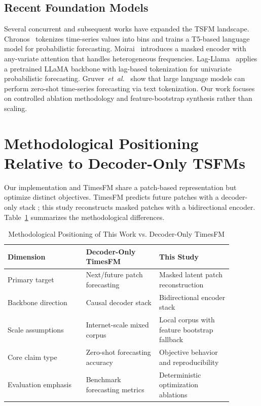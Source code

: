 \documentclass[journal]{IEEEtran}
\begin{document}
\subsection{Recent Foundation Models}
Several concurrent and subsequent works have expanded the TSFM landscape. Chronos~\cite{chronos2024} tokenizes time-series values into bins and trains a T5-based language model for probabilistic forecasting. Moirai~\cite{moirai2024} introduces a masked encoder with any-variate attention that handles heterogeneous frequencies. Lag-Llama~\cite{lagllama2024} applies a pretrained LLaMA backbone with lag-based tokenization for univariate probabilistic forecasting. Gruver~\emph{et~al.}~\cite{gruver2023llmtime} show that large language models can perform zero-shot time-series forecasting via text tokenization. Our work focuses on controlled ablation methodology and feature-bootstrap synthesis rather than scaling.

\section{Methodological Positioning Relative to Decoder-Only TSFMs}
Our implementation and TimesFM share a patch-based representation but optimize distinct objectives. TimesFM predicts future patches with a decoder-only stack \cite{timesfm}; this study reconstructs masked patches with a bidirectional encoder. Table~\ref{tab:positioning} summarizes the methodological differences.

\begin{table}[t]
\caption{Methodological Positioning of This Work vs. Decoder-Only TimesFM}
\label{tab:positioning}
\centering
\begin{tabular}{p{0.30\linewidth}p{0.29\linewidth}p{0.29\linewidth}}
\toprule
Dimension & Decoder-Only TimesFM & This Study \\
\midrule
Primary target & Next/future patch forecasting & Masked latent patch reconstruction \\
Backbone direction & Causal decoder stack & Bidirectional encoder stack \\
Scale assumptions & Internet-scale mixed corpus & Local corpus with feature bootstrap fallback \\
Core claim type & Zero-shot forecasting accuracy & Objective behavior and reproducibility \\
Evaluation emphasis & Benchmark forecasting metrics & Deterministic optimization ablations \\
\bottomrule
\end{tabular}
\end{table}
\end{document}
